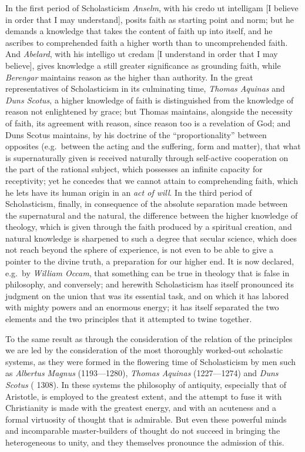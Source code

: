 In the first period of Scholasticism \emph{Anselm}, with his credo ut intelligam [I believe in order that I may understand], posits faith as starting point and norm; but he demands a knowledge that takes the content of faith up into itself, and he ascribes to comprehended faith a higher worth than to uncomprehended faith. And \emph{Abelard}, with his intelligo ut credam [I understand in order that I may believe], gives knowledge a still greater significance as grounding faith, while \emph{Berengar} maintains reason as the higher than authority. In the great representatives of Scholasticism in its culminating time, \emph{Thomas Aquinas} and \emph{Duns Scotus}, a higher knowledge of faith is distinguished from the knowledge of reason not enlightened by grace; but Thomas maintains, alongside the necessity of faith, its agreement with reason, since reason too is a revelation of God; and Duns Scotus maintains, by his doctrine of the ``proportionality'' between opposites (e.g.\ between the acting and the suffering, form and matter), that what is supernaturally given is received naturally through self-active cooperation on the part of the rational subject, which possesses an infinite capacity for receptivity; yet he concedes that we cannot attain to comprehending faith, which he lets have its human origin in an \emph{act of will}. In the third period of Scholasticism, finally, in consequence of the absolute separation made between the supernatural and the natural, the difference between the higher knowledge of theology, which is given through the faith produced by a spiritual creation, and natural knowledge is sharpened to such a degree that secular science, which does not reach beyond the sphere of experience, is not even to be able to give a pointer to the divine truth, a preparation for our higher end. It is now declared, e.g.\ by \emph{William Occam}, that something can be true in theology that is false in philosophy, and conversely; and herewith Scholasticism has itself pronounced its judgment on the union that was its essential task, and on which it has labored with mighty powers and an enormous energy; it has itself separated the two elements and the two principles that it attempted to twine together.

To the same result as through the consideration of the relation of the principles we are led by the consideration of the most thoroughly worked-out scholastic systems, as they were formed in the flowering time of Scholasticism by men such as \emph{Albertus Magnus} (1193---1280), \emph{Thomas Aquinas} (1227---1274) and \emph{Duns Scotus} (\dag{} 1308). In these systems the philosophy of antiquity, especially that of Aristotle, is employed to the greatest extent, and the attempt to fuse it with Christianity is made with the greatest energy, and with an acuteness and a formal virtuosity of thought that is admirable. But even these powerful minds and incomparable master-builders of thought do not succeed in bringing the heterogeneous to unity, and they themselves pronounce the admission of this.

